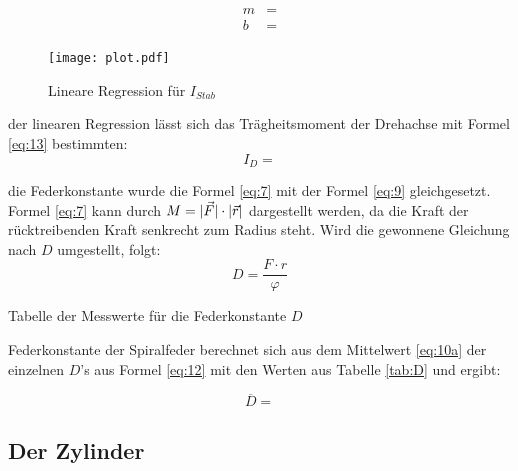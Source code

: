 \begin{subequations}
\begin{align}
m &= \text{}\label{eq:14a}\\
b &= \text{}\label{eq:14b}
\end{align}
\end{subequations}
\newpage

\begin{figure}[H]
    \centering
    \texttt{[image: plot.pdf]}
    \caption{Lineare Regression für $I_{Stab}$}
    \label{fig:1}
\end{figure}


\justifying der linearen Regression lässt sich das Trägheitsmoment der Drehachse mit Formel \eqref{eq:13} bestimmten:
\begin{equation}
I_D = \label{eq:15} %
\end{equation}


\justifying die Federkonstante wurde die Formel \eqref{eq:7} mit der Formel \eqref{eq:9} gleichgesetzt. Formel \eqref{eq:7} kann durch $M = \lvert\vec{F}\rvert \cdot \lvert\vec{r}\rvert$
dargestellt werden, da die Kraft der rücktreibenden Kraft senkrecht zum Radius steht. Wird die gewonnene Gleichung nach $D$ umgestellt, folgt:
\begin{equation}
D = \frac{F\cdot r}{\varphi}\label{eq:16}
\end{equation}

\begin{table}[H]
    \centering
    
    \caption{Tabelle der Messwerte für die Federkonstante $D$}
    \label{tab:D}
\end{table}


\justifying Federkonstante der Spiralfeder berechnet sich aus dem Mittelwert \eqref{eq:10a} der einzelnen $D$'s aus 
Formel \eqref{eq:12} mit den Werten aus Tabelle \ref{tab:D} und ergibt:

\begin{equation}
\overline{D} = \text{} \label{eq:17} %
\end{equation}

\subsection{Der Zylinder}\justifying %

